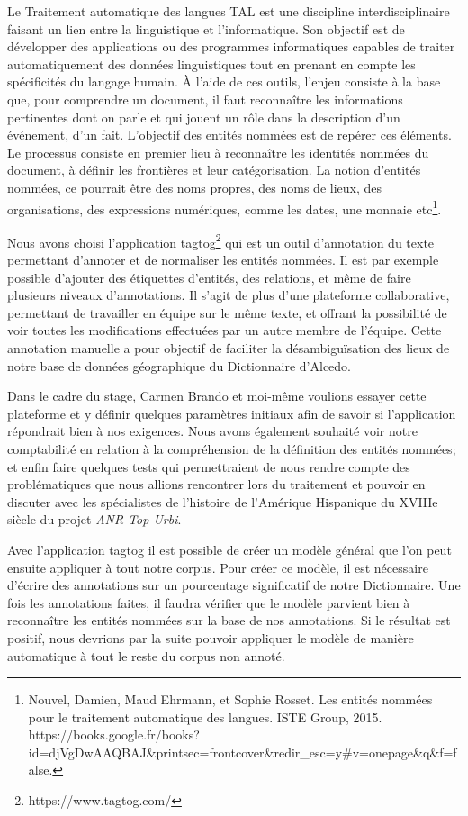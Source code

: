 \documentclass[a4paper,12pt,twoside]{book}
\begin{document}
Le Traitement automatique des langues TAL est une discipline interdisciplinaire faisant un lien entre la linguistique et l’informatique. Son objectif est de développer des applications ou des programmes informatiques capables de traiter automatiquement des données linguistiques tout en prenant en compte les spécificités du langage humain. À l’aide de ces outils, l’enjeu consiste à la base que, pour comprendre un document, il faut reconnaître les informations pertinentes dont on parle et qui jouent un rôle dans la description d’un événement, d’un fait. L’objectif des entités nommées est de repérer ces éléments. Le processus consiste en premier lieu à reconnaître les identités nommées du document, à définir les frontières et leur catégorisation. La notion d’entités nommées, ce pourrait être des noms propres, des noms de lieux, des organisations, des expressions numériques, comme les dates, une monnaie etc\footnote{Nouvel, Damien, Maud Ehrmann, et Sophie Rosset. Les entités nommées pour le traitement automatique des langues. ISTE Group, 2015. https://books.google.fr/books?id=djVgDwAAQBAJ\&printsec=frontcover\&redir\_esc=y\#v=onepage\&q\&f=false.}.

Nous avons choisi l’application tagtog\footnote{https://www.tagtog.com/} qui est un outil d’annotation du texte permettant d’annoter et de normaliser les entités nommées. Il est par exemple possible d’ajouter des étiquettes d’entités, des relations, et même de faire plusieurs niveaux d’annotations. Il s’agit de plus d’une plateforme collaborative, permettant de travailler en équipe sur le même texte, et offrant la possibilité de voir toutes les modifications effectuées par un autre membre de l’équipe. Cette annotation manuelle a pour objectif de faciliter la désambiguïsation des lieux de notre base de données géographique du Dictionnaire d’Alcedo.
	
Dans le cadre du stage, Carmen Brando et moi-même voulions essayer cette plateforme et y définir quelques paramètres initiaux afin de savoir si l’application répondrait bien à nos exigences. Nous avons également souhaité voir notre comptabilité en relation à la compréhension de la définition des entités nommées; et enfin faire quelques tests qui permettraient de nous rendre compte des problématiques que nous allions rencontrer lors du traitement et pouvoir en discuter avec les spécialistes de l’histoire de l’Amérique Hispanique du XVIIIe siècle du projet \textit{ANR Top Urbi}.

Avec l’application tagtog il est possible de créer un modèle général que l’on peut ensuite appliquer à tout notre corpus. Pour créer ce modèle, il est nécessaire d’écrire des annotations sur un pourcentage significatif de notre Dictionnaire. Une fois les annotations faites, il faudra vérifier que le modèle parvient bien à reconnaître les entités nommées sur la base de nos annotations. Si le résultat est positif, nous devrions par la suite pouvoir appliquer le modèle de manière automatique à tout le reste du corpus non annoté. 
\end{document}

